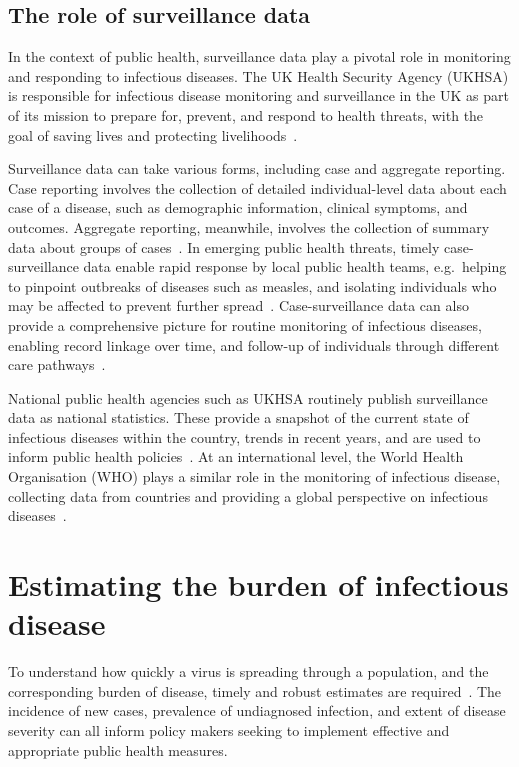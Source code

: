 \subsection{The role of surveillance data}

In the context of public health, surveillance data play a pivotal role in monitoring and responding to infectious diseases. The UK Health Security Agency (UKHSA) is responsible for infectious disease monitoring and surveillance in the UK as part of its mission to prepare for, prevent, and respond to health threats, with the goal of saving lives and protecting livelihoods~\parencite{UK_Health_Security_Agency2023-jp}.

Surveillance data can take various forms, including case and aggregate reporting. Case reporting involves the collection of detailed individual-level data about each case of a disease, such as demographic information, clinical symptoms, and outcomes. Aggregate reporting, meanwhile, involves the collection of summary data about groups of cases~\parencite{Murray2017-me}. In emerging public health threats, timely case-surveillance data enable rapid response by local public health teams, e.g.\ helping to pinpoint outbreaks of diseases such as measles, and isolating individuals who may be affected to prevent further spread~\parencite{Jajosky2004-wr}. Case-surveillance data can also provide a comprehensive picture for routine monitoring of infectious diseases, enabling record linkage over time, and follow-up of individuals through different care pathways~\parencite{Trostian2022-lx}.

National public health agencies such as UKHSA routinely publish surveillance data as national statistics. These provide a snapshot of the current state of infectious diseases within the country, trends in recent years, and are used to inform public health policies~\parencite{UK-Health-Security-Agency2020-wc}. At an international level, the World Health Organisation (WHO) plays a similar role in the monitoring of infectious disease, collecting data from countries and providing a global perspective on infectious diseases~\parencite{World_Health_Organization2020-lp}.

\section{Estimating the burden of infectious disease}

To understand how quickly a virus is spreading through a population, and the corresponding burden of disease, timely and robust estimates are required~\parencite{De-Angelis2015-uy}. The incidence of new cases, prevalence of undiagnosed infection, and extent of disease severity can all inform policy makers seeking to implement effective and appropriate public health measures.


